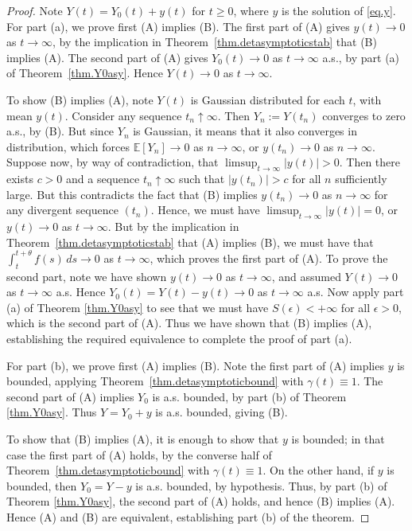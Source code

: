 \documentclass[a4paper,10pt,reqno]{amsart}
\numberwithin{equation}{section}
\theoremstyle{definition}
\theoremstyle{remark}
\DeclareMathOperator{\1}{\mathbbm 1}
\begin{document}
\begin{proof}
Note $Y(t)=Y_0(t)+y(t)$ for $t\geq 0$, where $y$ is the solution of \eqref{eq.y}. 
For part (a), we prove first  (A) implies (B). The first part of (A) gives $y(t)\to 0$ as $t\to\infty$, by the implication in Theorem~\ref{thm.detasymptoticstab} that (B) implies (A). The second part of (A) gives $Y_0(t)\to 0$ as $t\to\infty$ a.s., by part (a) of Theorem~\ref{thm.Y0asy}. Hence $Y(t)\to 0$ as $t\to\infty$.

To show (B) implies (A), note $Y(t)$ is Gaussian distributed for each $t$, with mean $y(t)$. Consider any sequence $t_n\uparrow \infty$. Then $Y_n:=Y(t_n)$ converges to zero a.s., by (B). But since $Y_n$ is Gaussian, it means that it also converges in distribution, which forces $\mathbb{E}[Y_n]\to 0$ as $n\to\infty$, or $y(t_n)\to 0$ as $n\to\infty$. Suppose now, by way of contradiction, that $\limsup_{t\to\infty} |y(t)|>0$. 
Then there exists $c>0$ and a sequence $t_n\uparrow \infty$ such that $|y(t_n)|>c$ for all $n$ sufficiently large. But this contradicts the fact that (B) implies $y(t_n)\to 0$ as $n\to\infty$ for any divergent sequence $(t_n)$. Hence, we must have $\limsup_{t\to\infty} |y(t)|=0$, or $y(t)\to 0$ as $t\to\infty$. But by the implication in Theorem~\ref{thm.detasymptoticstab} that (A) implies (B), we must have that $\int_t^{t+\theta} f(s)\,ds\to 0$ as $t\to\infty$, which proves the first part of (A). To prove the second part, note we have shown $y(t)\to 0$ as $t\to\infty$, and assumed $Y(t)\to 0$ as $t\to\infty$ a.s. Hence $Y_0(t)=Y(t)-y(t)\to 0$ as $t\to\infty$ a.s. Now apply part (a) of Theorem \ref{thm.Y0asy} to see that  we must have $S(\epsilon)<+\infty$ for all $\epsilon>0$, which is the second part of (A). Thus we have shown that (B) implies (A), establishing the required equivalence to complete the proof of part (a).  

For part (b), we prove first (A) implies (B). Note the first part of (A) implies $y$ is bounded, applying Theorem~\ref{thm.detasymptoticbound}
with  $\gamma(t)\equiv 1$. The second part of (A) implies $Y_0$ is a.s. bounded, by part (b) of Theorem \ref{thm.Y0asy}. Thus $Y=Y_0+y$ is a.s. bounded, giving (B). 

To show that (B) implies (A), it is enough to show that $y$ is bounded; in that case the first part of (A) holds, by the converse half of Theorem~\ref{thm.detasymptoticbound}
with  $\gamma(t)\equiv 1$. On the other hand, if $y$ is bounded, then $Y_0=Y-y$ is a.s. bounded, by hypothesis. Thus, by part (b) of Theorem \ref{thm.Y0asy}, the second part of (A) holds, and hence (B) implies (A). Hence (A) and (B) are equivalent, establishing part (b) of the theorem. 


\end{proof}
\end{document}
